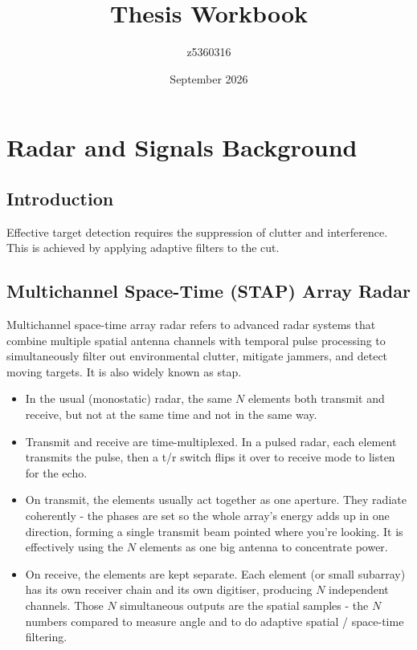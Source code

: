 \documentclass{article}
\title{Thesis Workbook}
\author{z5360316}
\date{September 2026}
\begin{document}
\maketitle

\section{Radar and Signals Background}
\label{sec:background}
\subsection{Introduction}

Effective target detection requires the suppression of clutter and interference. This is achieved by applying adaptive filters to the \gls{cut}.

\subsection{Multichannel Space-Time (STAP) Array Radar}
Multichannel space-time array radar refers to advanced radar systems that combine multiple spatial antenna channels with temporal pulse processing to simultaneously filter out environmental clutter, mitigate jammers, and detect moving targets. It is also widely known as \gls{stap}.
\begin{itemize}
    \item In the usual (monostatic) radar, the same $N$ elements both transmit and receive, but not at the same time and not in the same way.
    \item Transmit and receive are time-multiplexed. In a pulsed radar, each element transmits the pulse, then a \gls{t/r} switch flips it over to receive mode to listen for the echo.
    \item On transmit, the elements usually act together as one aperture. They radiate coherently - the phases are set so the whole array's energy adds up in one direction, forming a single transmit beam pointed where you're looking. It is effectively using the $N$ elements as one big antenna to concentrate power.
    \item On receive, the elements are kept separate. Each element (or small subarray) has its own receiver chain and its own digitiser, producing $N$ independent channels. Those $N$ simultaneous outputs are the spatial samples - the $N$ numbers compared to measure angle and to do adaptive spatial / space-time filtering.
\end{itemize}
\end{document}
